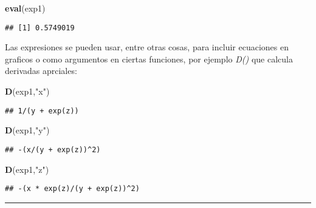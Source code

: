 \documentclass[11pt,]{article}
\newenvironment{Shaded}{\begin{snugshade}}{\end{snugshade}}
\newcommand{\KeywordTok}[1]{\textcolor[rgb]{0.13,0.29,0.53}{\textbf{#1}}}
\newcommand{\NormalTok}[1]{#1}
\newcommand{\StringTok}[1]{\textcolor[rgb]{0.31,0.60,0.02}{#1}}
\begin{document}
\begin{Shaded}
\begin{Highlighting}[]
\KeywordTok{eval}\NormalTok{(exp1)}
\end{Highlighting}
\end{Shaded}

\begin{verbatim}
## [1] 0.5749019
\end{verbatim}

Las expresiones se pueden usar, entre otras cosas, para incluir
ecuaciones en graficos o como argumentos en ciertas funciones, por
ejemplo \emph{D()} que calcula derivadas aprciales:

\begin{Shaded}
\begin{Highlighting}[]
\KeywordTok{D}\NormalTok{(exp1,}\StringTok{"x"}\NormalTok{)}
\end{Highlighting}
\end{Shaded}

\begin{verbatim}
## 1/(y + exp(z))
\end{verbatim}

\begin{Shaded}
\begin{Highlighting}[]
\KeywordTok{D}\NormalTok{(exp1,}\StringTok{"y"}\NormalTok{)}
\end{Highlighting}
\end{Shaded}

\begin{verbatim}
## -(x/(y + exp(z))^2)
\end{verbatim}

\begin{Shaded}
\begin{Highlighting}[]
\KeywordTok{D}\NormalTok{(exp1,}\StringTok{"z"}\NormalTok{)}
\end{Highlighting}
\end{Shaded}

\begin{verbatim}
## -(x * exp(z)/(y + exp(z))^2)
\end{verbatim}

\begin{center}\rule{0.5\linewidth}{0.5pt}\end{center}

\newpage
\singlespacing 
\end{document}
